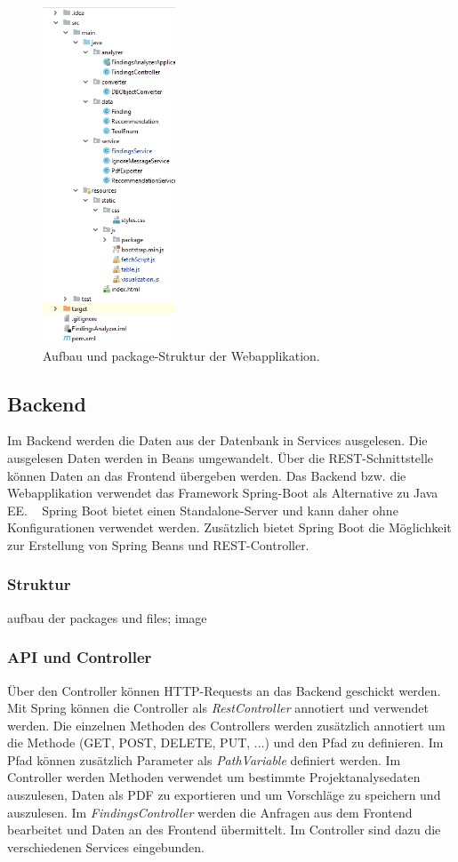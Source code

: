 \begin{figure}[tp]
  \centering
  \includegraphics[height=10cm]{images/structure.PNG}
 \caption[Aufbau und package-Struktur der Webapplikation.]{Aufbau und package-Struktur der Webapplikation.}
  \label{fig:structure}
\end{figure}

\subsection{Backend}
Im Backend werden die Daten aus der Datenbank in Services ausgelesen. Die ausgelesen Daten werden in Beans umgewandelt. Über die REST-Schnittstelle können Daten an das Frontend übergeben werden. Das Backend bzw. die Webapplikation verwendet das Framework Spring-Boot als Alternative zu Java EE. ~\parencite{walls2016spring} Spring Boot bietet einen Standalone-Server und kann daher ohne Konfigurationen verwendet werden. Zusätzlich bietet Spring Boot die Möglichkeit zur Erstellung von Spring Beans und REST-Controller.  

\subsubsection{Struktur}
aufbau der packages und files; image
\subsubsection{API und Controller}
Über den Controller können HTTP-Requests an das Backend geschickt werden. Mit Spring können die Controller als \textit{RestController} annotiert und verwendet werden. Die einzelnen Methoden des Controllers werden zusätzlich annotiert um die Methode (GET, POST, DELETE, PUT, ...) und den Pfad zu definieren. Im Pfad können zusätzlich Parameter als \textit{PathVariable} definiert werden. Im Controller werden  Methoden verwendet um bestimmte Projektanalysedaten auszulesen, Daten als PDF zu exportieren und um Vorschläge zu speichern und auszulesen. Im \textit{FindingsController} werden die Anfragen aus dem Frontend bearbeitet und Daten an des Frontend übermittelt. Im Controller sind dazu die verschiedenen Services eingebunden.
